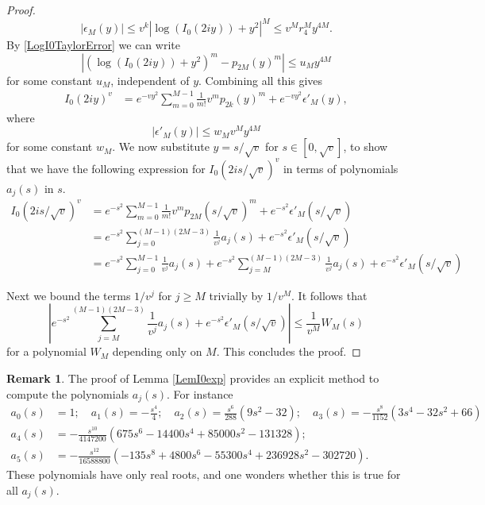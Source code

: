 \documentclass[12pt,reqno]{amsart}
\theoremstyle{definition}
\theoremstyle{plain}
\theoremstyle{definition}
\newtheorem{remark}[theorem]{Remark}
\renewcommand{\geq}{\geqslant}
\renewcommand{\leq}{\leqslant}
\begin{document}
\begin{proof}
	\[
	|\epsilon_M(y)| \leq  v^{k} |\log(I_0(2 i y)) + y^2|^{M} \leq v^{M} r_4^{M} y^{4 M}.
	\]
	By \eqref{LogI0TaylorError} we can write
	\[
	\left| (\log(I_0(2 i y)) + y^2)^m - p_{2M}(y)^m \right| \leq u_M y^{4M}
	\]
	for some constant $u_M$, independent of $y$.
	Combining all this gives
	\begin{align}
		I_0(2 i y)^v     &=e^{-vy^2}\sum_{m = 0}^{M-1}\frac{1}{m!} v^m p_{2k}(y)^m + e^{-v y^2}\epsilon'_{M}(y),
	\end{align}
	where
	\begin{equation}
		|\epsilon'_{M}(y)| \leq w_M v^M y^{4M}    
	\end{equation}
	for some constant $w_M$.  We now substitute $y = s/\sqrt{v}$ for $s \in [0, \sqrt{v}]$, to show that we have the following expression for $I_0(2 i s/\sqrt{v})^v$ in terms of polynomials $a_j(s)$ in $s$.	
	\begin{align}
		I_0(2 i s/\sqrt{v})^v 
		&=e^{-s^2}\sum_{m = 0}^{M-1}\frac{1}{m!} v^m p_{2M}(s/\sqrt{v})^m + e^{-s^2}\epsilon'_{M}(s/\sqrt{v})\\
		&=e^{-s^2} \sum_{j = 0}^{(M-1)(2M - 3)} \frac{1}{v^j} a_j(s)   
		+ e^{-s^2}\epsilon'_{M}(s/\sqrt{v})\\
		&= e^{-s^2} \sum_{j = 0}^{M-1} \frac{1}{v^j} a_j(s) + e^{-s^2} \sum_{j = M}^{(M-1)(2M - 3)} \frac{1}{v^j} a_j(s)  
		+ e^{-s^2}\epsilon'_{M}(s/\sqrt{v})
	\end{align}
	
	Next we bound the terms $1/v^j$ for $j \geq M$ trivially by $1/v^M$. It follows that
	\[
	\left|e^{-s^2} \sum_{j = M}^{(M-1)(2M - 3)} \frac{1}{v^j} a_j(s)  
	+ e^{-s^2}\epsilon'_{M}(s/\sqrt{v}) \right| \leq \frac{1}{v^M} W_M(s)
	\]
	for a polynomial $W_M$ depending only on $M$. This concludes the proof.
\end{proof}
\begin{remark}
The proof of Lemma \ref{LemI0exp} provides an explicit method to compute the polynomials $a_j(s)$. For instance
\begin{align*}
	a_0(s) &= 1; \quad
	a_1(s) = -\frac{s^4}{4}; \quad
	a_2(s) = \frac{s^6}{288} \left(9 s^2-32\right); \quad
	a_3(s) = -\frac{s^8}{1152}  \left(3 s^4-32 s^2+66\right)\\
	a_4(s) &= -\frac{s^{10}}{4147200}\left(675 s^6-14400 s^4+85000 s^2-131328\right);
	\\a_5(s) &= -\frac{s^{12}}{16588800}\left(-135 s^8+4800 s^6-55300 s^4+236928 s^2-302720\right). 
\end{align*}
These polynomials have only real roots, and one wonders whether this is true for all $a_j(s)$.    
\end{remark}
\end{document}
